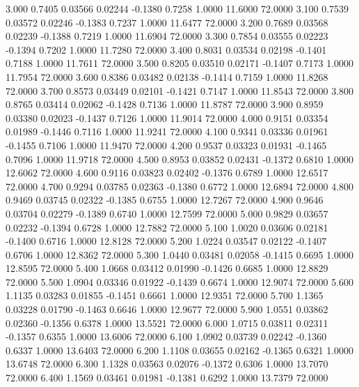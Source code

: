    3.000   0.7405   0.03566   0.02244  -0.1380   0.7258   1.0000  11.6000  72.0000
   3.100   0.7539   0.03572   0.02246  -0.1383   0.7237   1.0000  11.6477  72.0000
   3.200   0.7689   0.03568   0.02239  -0.1388   0.7219   1.0000  11.6904  72.0000
   3.300   0.7854   0.03555   0.02223  -0.1394   0.7202   1.0000  11.7280  72.0000
   3.400   0.8031   0.03534   0.02198  -0.1401   0.7188   1.0000  11.7611  72.0000
   3.500   0.8205   0.03510   0.02171  -0.1407   0.7173   1.0000  11.7954  72.0000
   3.600   0.8386   0.03482   0.02138  -0.1414   0.7159   1.0000  11.8268  72.0000
   3.700   0.8573   0.03449   0.02101  -0.1421   0.7147   1.0000  11.8543  72.0000
   3.800   0.8765   0.03414   0.02062  -0.1428   0.7136   1.0000  11.8787  72.0000
   3.900   0.8959   0.03380   0.02023  -0.1437   0.7126   1.0000  11.9014  72.0000
   4.000   0.9151   0.03354   0.01989  -0.1446   0.7116   1.0000  11.9241  72.0000
   4.100   0.9341   0.03336   0.01961  -0.1455   0.7106   1.0000  11.9470  72.0000
   4.200   0.9537   0.03323   0.01931  -0.1465   0.7096   1.0000  11.9718  72.0000
   4.500   0.8953   0.03852   0.02431  -0.1372   0.6810   1.0000  12.6062  72.0000
   4.600   0.9116   0.03823   0.02402  -0.1376   0.6789   1.0000  12.6517  72.0000
   4.700   0.9294   0.03785   0.02363  -0.1380   0.6772   1.0000  12.6894  72.0000
   4.800   0.9469   0.03745   0.02322  -0.1385   0.6755   1.0000  12.7267  72.0000
   4.900   0.9646   0.03704   0.02279  -0.1389   0.6740   1.0000  12.7599  72.0000
   5.000   0.9829   0.03657   0.02232  -0.1394   0.6728   1.0000  12.7882  72.0000
   5.100   1.0020   0.03606   0.02181  -0.1400   0.6716   1.0000  12.8128  72.0000
   5.200   1.0224   0.03547   0.02122  -0.1407   0.6706   1.0000  12.8362  72.0000
   5.300   1.0440   0.03481   0.02058  -0.1415   0.6695   1.0000  12.8595  72.0000
   5.400   1.0668   0.03412   0.01990  -0.1426   0.6685   1.0000  12.8829  72.0000
   5.500   1.0904   0.03346   0.01922  -0.1439   0.6674   1.0000  12.9074  72.0000
   5.600   1.1135   0.03283   0.01855  -0.1451   0.6661   1.0000  12.9351  72.0000
   5.700   1.1365   0.03228   0.01790  -0.1463   0.6646   1.0000  12.9677  72.0000
   5.900   1.0551   0.03862   0.02360  -0.1356   0.6378   1.0000  13.5521  72.0000
   6.000   1.0715   0.03811   0.02311  -0.1357   0.6355   1.0000  13.6006  72.0000
   6.100   1.0902   0.03739   0.02242  -0.1360   0.6337   1.0000  13.6403  72.0000
   6.200   1.1108   0.03655   0.02162  -0.1365   0.6321   1.0000  13.6748  72.0000
   6.300   1.1328   0.03563   0.02076  -0.1372   0.6306   1.0000  13.7070  72.0000
   6.400   1.1569   0.03461   0.01981  -0.1381   0.6292   1.0000  13.7379  72.0000
